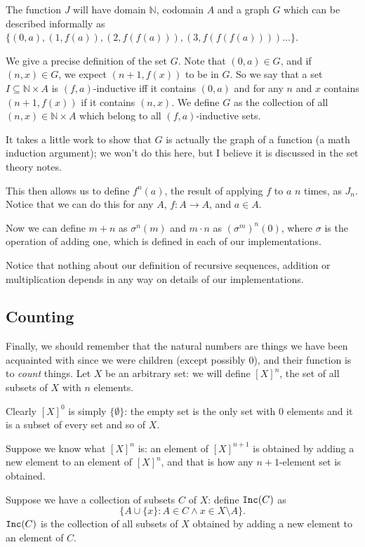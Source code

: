 \documentclass[12pt]{article}
\begin{document}
The function $J$ will have domain $\mathbb N$, codomain $A$ and a graph $G$ which can be described informally as $\{(0,a),(1,f(a)),(2,f(f(a))),(3,f(f(f(a))))\ldots\}$.

We give a precise definition of the set $G$.  Note that $(0,a) \in G$, and if $(n,x) \in G$, we expect $(n+1,f(x))$ to be in $G$.
So we say that a set $I \subseteq \mathbb N \times A$ is $(f,a)$-inductive iff it contains $(0,a)$ and for any $n$ and $x$ contains $(n+1,f(x))$ if it contains
$(n,x)$.  We define $G$ as the collection of all $(n,x) \in \mathbb N \times A$ which belong to all $(f,a)$-inductive sets.

It takes a little work to show that $G$ is actually the graph of a function (a math induction argument);  we won't do this here, but I believe it is discussed in the set theory notes.

This then allows us to define $f^n(a)$, the result of applying $f$ to $a$ $n$ times, as $J_n$.  Notice that we can do this for any $A$, $f:A \rightarrow A$, and $a \in A$.

Now we can define $m+n$ as $\sigma^n(m)$ and $m \cdot n$ as $(\sigma^m)^n(0)$, where $\sigma$ is the operation of adding one, which is defined in each of our implementations.

Notice that nothing about our definition of recursive sequences, addition or multiplication depends in any way on details of our implementations.

\subsection{Counting}

Finally, we should remember that the natural numbers are things we have been acquainted with since we were children (except possibly 0), and their function is to {\em count\/} things.  Let $X$ be an arbitrary set:  we will define $[X]^n$, the set of all subsets of $X$ with $n$ elements.

Clearly $[X]^0$ is simply $\{\emptyset\}$:  the empty set is the only set with 0 elements and it is a subset of every set and so of $X$.

Suppose we know what $[X]^n$ is:  an element of $[X]^{n+1}$ is obtained by adding a new element to an element of $[X]^n$, and that is how any $n+1$-element set is obtained.

Suppose we have a collection of subsets $C$ of $X$:  define ${\tt Inc}(C)$ as $$\{A \cup \{x\}:A \in C \wedge x \in X \setminus A\}.$$  ${\tt Inc}(C)$ is the collection of all subsets of $X$ obtained by adding a new element to an element of $C$.
\end{document}
